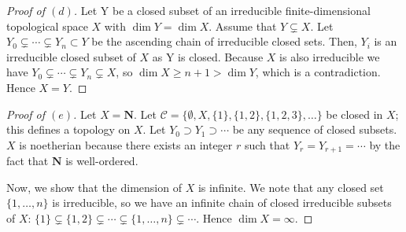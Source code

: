 \documentclass[10pt]{article}
\theoremstyle{definition}
\theoremstyle{remark}
\numberwithin{equation}{section}
\numberwithin{figure}{subsubsection}
\begin{document}
\begin{proof}[Proof of $(d)$]
	Let Y be a closed subset of an irreducible finite-dimensional topological space $X$ with $\dim Y = \dim X$. 
	Assume that $Y \subsetneq X$. Let $Y_0 \subsetneq \cdots \subsetneq Y_n
  \subset Y$ be the ascending chain of irreducible closed sets. Then, $Y_i$ is
  an irreducible closed subset of $X$ as Y is closed. Because $X$ is also irreducible we have $Y_0 \subsetneq \cdots \subsetneq Y_n \subsetneq X$, so $\dim X \geq n+1 > \dim Y$, which is a contradiction. Hence $X = Y$. 
\end{proof}
\begin{proof}[Proof of $(e)$]
  Let $X = \mathbf{N}$. Let $\mathscr{C} = \{ \emptyset, X, \{1\},
  \{1,2\}, \{1,2,3\},\ldots\}$ be closed in $X$; this defines a topology on $X$.
	Let $Y_0 \supset Y_1 \supset \cdots$ be any sequence of closed subsets.
  $X$ is noetherian because there exists an integer $r$ such that $Y_r = Y_{r+1}
  = \cdots$ by the fact that $\mathbf{N}$ is well-ordered. 
	\par Now, we show that the dimension of $X$ is infinite.
  We note that any closed set $\{1, \ldots,n\}$ is irreducible, so we have an
  infinite chain of closed irreducible subsets of $X$: $\{1\} \subsetneq \{1,2\}
  \subsetneq \cdots \subsetneq \{1,\ldots,n\} \subsetneq \cdots$. Hence $\dim X
  = \infty$.
\end{proof}
\end{document}
